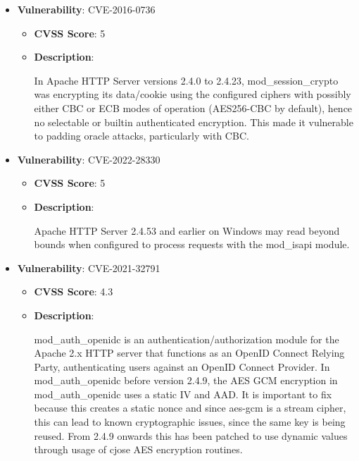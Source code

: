 \documentclass{article}
\begin{document}
\begin{itemize}
        \item \textbf{Vulnerability}: CVE-2016-0736
        \begin{itemize}
            \item \textbf{CVSS Score}:  5 
            \item \textbf{Description}:
            \parbox[t]{0.9\linewidth}{
                \ttfamily In Apache HTTP Server versions 2.4.0 to 2.4.23, mod\_session\_crypto was encrypting its data/cookie using the configured ciphers with possibly either CBC or ECB modes of operation (AES256-CBC by default), hence no selectable or builtin authenticated encryption. This made it vulnerable to padding oracle attacks, particularly with CBC.
            }
        \end{itemize}
    
        \item \textbf{Vulnerability}: CVE-2022-28330
        \begin{itemize}
            \item \textbf{CVSS Score}:  5 
            \item \textbf{Description}:
            \parbox[t]{0.9\linewidth}{
                \ttfamily Apache HTTP Server 2.4.53 and earlier on Windows may read beyond bounds when configured to process requests with the mod\_isapi module.
            }
        \end{itemize}
    
        \item \textbf{Vulnerability}: CVE-2021-32791
        \begin{itemize}
            \item \textbf{CVSS Score}:  4.3 
            \item \textbf{Description}:
            \parbox[t]{0.9\linewidth}{
                \ttfamily mod\_auth\_openidc is an authentication/authorization module for the Apache 2.x HTTP server that functions as an OpenID Connect Relying Party, authenticating users against an OpenID Connect Provider. In mod\_auth\_openidc before version 2.4.9, the AES GCM encryption in mod\_auth\_openidc uses a static IV and AAD. It is important to fix because this creates a static nonce and since aes-gcm is a stream cipher, this can lead to known cryptographic issues, since the same key is being reused. From 2.4.9 onwards this has been patched to use dynamic values through usage of cjose AES encryption routines.
            }
        \end{itemize}
    

\end{itemize}
\end{document}
